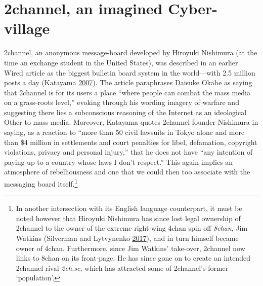 \documentclass[10pt,british,A4paper,,openany]{memoir}
\begin{document}
\section{2channel, an imagined
Cyber-village}\label{channel-an-imagined-cyber-village}

2channel, an anonymous message-board developed by Hiroyuki Nishimura (at
the time an exchange student in the United States), was described in an
earlier Wired article as the biggest bulletin board system in the
world---with 2.5 million posts a day (Katayama
\protect\hyperlink{ref-katayama_2-channel_2007}{2007}). The article
paraphrases Daisuke Okabe as saying that 2channel is for its users a
place ``where people can combat the mass media on a grass-roots level,''
evoking through his wording imagery of warfare and suggesting there lies
a subconscious reasoning of the Internet as an ideological Other to
mass-media. Moreover, Katayama quotes 2channel founder Nishimura in
saying, as a reaction to ``more than 50 civil lawsuits in Tokyo alone
and more than \$4 million in settlements and court penalties for libel,
defamation, copyright violations, privacy and personal injury,'' that he
does not have ``any intention of paying up to a country whose laws I
don't respect.'' This again implies an atmosphere of rebelliousness and
one that we could then too associate with the messaging board
itself.\footnote{In another intersection with its English language
  counterpart, it must be noted however that Hiroyuki Nishimura has
  since lost legal ownership of 2channel to the owner of the extreme
  right-wing 4chan spin-off \emph{8chan}, Jim Watkins (Silverman and
  Lytvynenko \protect\hyperlink{ref-silverman_meet_2017}{2017}), and in
  turn himself became owner of 4chan. Furthermore, since Jim Watkins'
  take-over, 2channel now links to 8chan on its front-page. He has since
  gone on to create an intended 2channel rival \emph{2ch.sc}, which has
  attracted some of 2channel's former `population'.}
\end{document}

